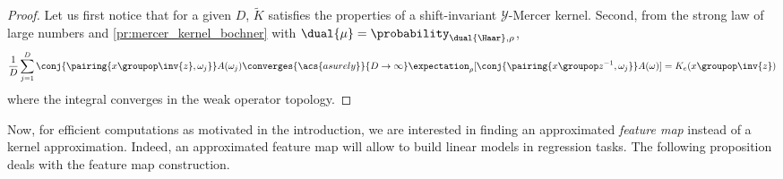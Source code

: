 \begin{proof}
Let us first notice that for a given $D$, $\tilde{K}$ satisfies the properties of a shift-invariant $\mathcal{Y}$-Mercer kernel.
Second, from the strong law of large numbers and
    \cref{pr:mercer_kernel_bochner} with
    $\dual{\mu}=\probability_{\dual{\Haar},\rho}$,
    \begin{dmath*}
        \frac{1}{D} \sum_{j=1}^D
        \conj{\pairing{x\groupop\inv{z},\omega_j}} A(\omega_j)
        \converges{\acs{asurely}}{D \to \infty}
        \expectation_{\rho}[\conj{\pairing{x \groupop
        z^{-1}, \omega_j} }A(\omega)]
     =K_e(x\groupop\inv{z})
    \end{dmath*}
  where the integral converges in the weak operator topology.

\end{proof}

Now, for efficient computations as motivated in the introduction, we are
interested in finding an approximated \emph{feature map} instead of a kernel
approximation. Indeed, an approximated feature map will allow to build linear
models in regression tasks. The following proposition deals with the feature map construction.

